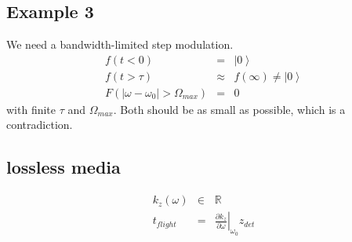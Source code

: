 \documentclass[12pt,a4paper,twoside,openright,BCOR10mm,headsepline,titlepage,abstracton,chapterprefix,final]{scrreprt}
\newcommand\wavenumber{k}
\begin{document}
\subsection{Example 3}
We need a bandwidth-limited step modulation.
\begin{eqnarray}
 f( t < 0 ) &=& \left|0\right> \\
 f( t > \tau) &\approx& f(\infty) \neq \left|0\right> \\
 F(|\omega - \omega_0| > \Omega_{max}) &=& 0
\end{eqnarray}
with finite $\tau$ and $\Omega_{max}$.
Both should be as small as possible, which is a contradiction.

\subsection{lossless media}
\begin{eqnarray}
 \wavenumber_z(\omega) &\in& \mathbb{R} \\
 t_{flight} &=& \left. \frac{\partial \wavenumber_z}{\partial \omega}\right|_{\omega_0} z_{det}
\end{eqnarray}
\end{document}
